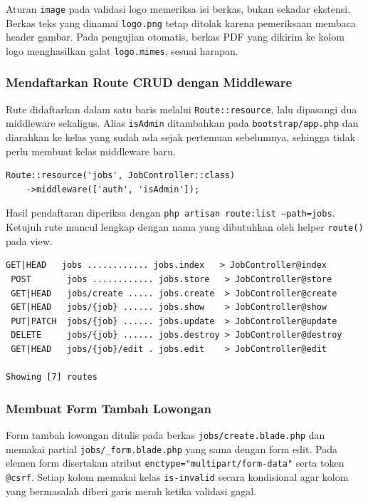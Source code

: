 \documentclass[12pt,a4paper]{article}
\begin{document}
Aturan \texttt{image} pada validasi logo memeriksa isi berkas, bukan sekadar ekstensi. Berkas teks yang dinamai \texttt{logo.png} tetap ditolak karena pemeriksaan membaca header gambar. Pada pengujian otomatis, berkas PDF yang dikirim ke kolom logo menghasilkan galat \texttt{logo.mimes}, sesuai harapan.

\subsubsection{Mendaftarkan Route CRUD dengan Middleware}

Rute didaftarkan dalam satu baris melalui \texttt{Route::resource}, lalu dipasangi dua middleware sekaligus. Alias \texttt{isAdmin} ditambahkan pada \texttt{bootstrap/app.php} dan diarahkan ke kelas  yang sudah ada sejak pertemuan sebelumnya, sehingga tidak perlu membuat kelas middleware baru.

\begin{lstlisting}[caption={Pendaftaran rute resource lowongan pada \texttt{routes/web.php}}, label={lst:route}]
Route::resource('jobs', JobController::class)
    ->middleware(['auth', 'isAdmin']);
\end{lstlisting}

Hasil pendaftaran diperiksa dengan \texttt{php artisan route:list --path=jobs}. Ketujuh rute muncul lengkap dengan nama yang dibutuhkan oleh helper \texttt{route()} pada view.

\begin{lstlisting}[caption={Keluaran \texttt{php artisan route:list --path=jobs}}, label={lst:routelist}, language={}]
 GET|HEAD   jobs ............ jobs.index   > JobController@index
 POST       jobs ............ jobs.store   > JobController@store
 GET|HEAD   jobs/create ..... jobs.create  > JobController@create
 GET|HEAD   jobs/{job} ...... jobs.show    > JobController@show
 PUT|PATCH  jobs/{job} ...... jobs.update  > JobController@update
 DELETE     jobs/{job} ...... jobs.destroy > JobController@destroy
 GET|HEAD   jobs/{job}/edit . jobs.edit    > JobController@edit

Showing [7] routes
\end{lstlisting}

\subsubsection{Membuat Form Tambah Lowongan}

Form tambah lowongan ditulis pada berkas \texttt{jobs/create.blade.php} dan memakai partial \texttt{jobs/\_form.blade.php} yang sama dengan form edit. Pada elemen form disertakan atribut \texttt{enctype="multipart/form-data"} serta token \texttt{@csrf}. Setiap kolom memakai kelas \texttt{is-invalid} secara kondisional agar kolom yang bermasalah diberi garis merah ketika validasi gagal.
\end{document}
